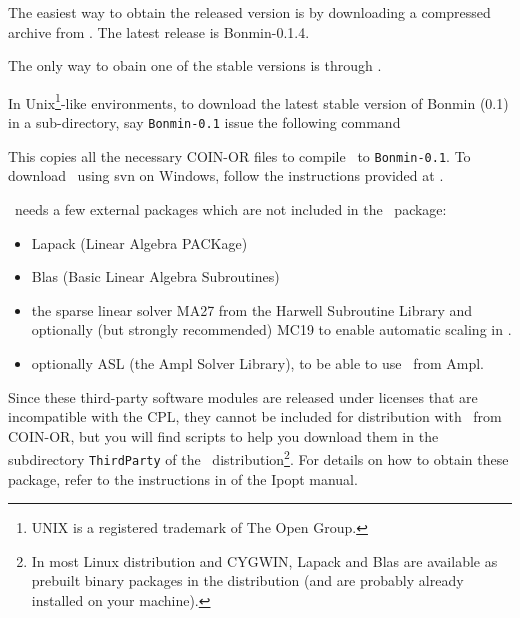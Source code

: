 The easiest way to obtain the released version is by downloading a compressed archive from . The latest release is Bonmin-0.1.4.

The only way to obain one of the stable versions is through .

In Unix\footnote{UNIX is a registered trademark of The Open
Group.}-like environments, to download the latest stable version of Bonmin (0.1) in a sub-directory, say {\tt Bonmin-0.1} 
issue the following command
\break

\begin{colorverb}
\end{colorverb}

\noindent This copies all the necessary COIN-OR files to compile \Bonmin\ to
{\tt Bonmin-0.1}. To download \Bonmin\ using svn on Windows,
follow the instructions provided at
.

\Bonmin\ needs a few external packages which are not included in the \Bonmin\ package:
\begin{itemize}
\item Lapack (Linear Algebra PACKage)
\item Blas (Basic Linear Algebra Subroutines)
\item the sparse linear solver MA27 from the Harwell Subroutine Library and optionally (but strongly recommended) MC19 to enable automatic scaling in \Ipopt.
\item optionally ASL (the Ampl Solver Library), to be able to use \Bonmin\ from Ampl.
\end{itemize}

Since these third-party software modules are released under licenses
that are incompatible with the CPL, they cannot be included for
distribution with \Bonmin\ from COIN-OR, but you will find scripts
to help you download them in the subdirectory {\tt ThirdParty} of
the \Bonmin\ distribution\footnote{In most Linux distribution and
CYGWIN, Lapack and Blas are available as prebuilt binary packages in
the distribution (and are probably already installed on your
machine).}. For details on how to obtain these package, refer to the
instructions in
 of the Ipopt manual.\\
